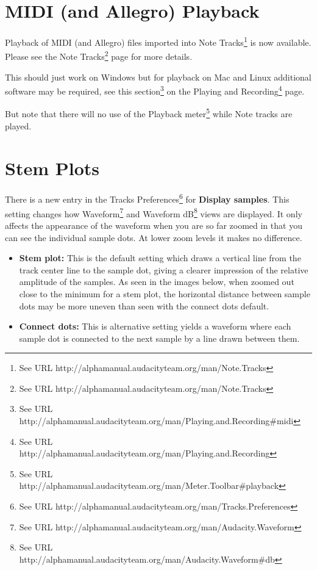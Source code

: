 

\section{
MIDI (and Allegro) Playback
}


Playback of MIDI (and Allegro) files imported into Note Tracks\footnote{See URL http://alphamanual.audacityteam.org/man/Note.Tracks} is now available.  Please see the Note Tracks\footnote{See URL http://alphamanual.audacityteam.org/man/Note.Tracks} page for more details.

This should just work on Windows but for playback on Mac and Linux additional software may be required, see this section\footnote{See URL http://alphamanual.audacityteam.org/man/Playing.and.Recording\#midi} on the Playing and Recording\footnote{See URL http://alphamanual.audacityteam.org/man/Playing.and.Recording} page.

But note that there will no use of the Playback meter\footnote{See URL http://alphamanual.audacityteam.org/man/Meter.Toolbar\#playback} while Note tracks are played. 



\section{
Stem Plots
}


There is a new entry in the Tracks Preferences\footnote{See URL http://alphamanual.audacityteam.org/man/Tracks.Preferences} for \textbf{Display samples}.  This setting changes how Waveform\footnote{See URL http://alphamanual.audacityteam.org/man/Audacity.Waveform} and Waveform dB\footnote{See URL http://alphamanual.audacityteam.org/man/Audacity.Waveform\#db} views are displayed.  It only affects the appearance of the waveform when you are so far zoomed in that you can see the individual sample dots.  At lower zoom levels it makes no difference.  
\begin{itemize}
\item \textbf{Stem plot:} This is the default setting which draws a vertical line from the track center line to the sample dot, giving a clearer impression of the relative amplitude of the samples. As seen in the images below, when zoomed out close to the minimum for a stem plot, the horizontal distance between sample dots may be more uneven than seen with the connect dots default.   
\item \textbf{Connect dots:} This is alternative setting yields a waveform where each sample dot is connected to the next sample by a line drawn between them.  
\end{itemize}

